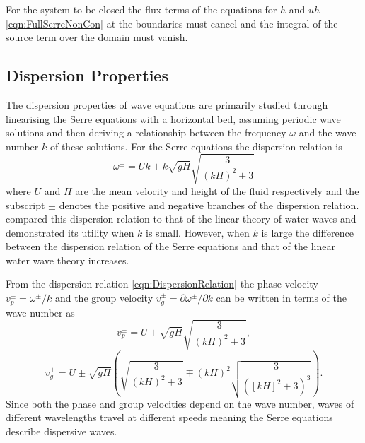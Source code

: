 For the system to be closed the flux terms of the equations for $h$ and $uh$ \eqref{eqn:FullSerreNonCon} at the boundaries must cancel and the integral of the source term over the domain must vanish.

\subsection{Dispersion Properties}
The dispersion properties of wave equations are primarily studied through linearising the Serre equations with a horizontal bed, assuming periodic wave solutions and then deriving a relationship between the frequency $\omega$ and the wave number $k$ of these solutions. For the Serre equations the dispersion relation \cite{Li-2014-169} is
\begin{equation}
\label{eqn:DispersionRelation}
\omega^\pm = Uk \pm k \sqrt{gH} \sqrt{\frac{3}{\left(kH\right)^2 + 3}}
\end{equation}
where $U$ and $H$ are the mean velocity and height of the fluid respectively and the subscript $\pm$ denotes the positive and negative branches of the dispersion relation. \citet{Barthelemy-2004-315} compared this dispersion relation to that of the linear theory of water waves and demonstrated its utility when $k$ is small. However, when $k$ is large the difference between the dispersion relation of the Serre equations and that of the linear water wave theory increases. 


From the dispersion relation \eqref{eqn:DispersionRelation} the phase velocity $v_p^\pm = \omega^\pm / k$  and the group velocity $v_g^\pm = \partial \omega^\pm / \partial  k$ can be written in terms of the wave number as
	\begin{equation*}
	\label{eqn:WaveVelocitiesPhase}
	v_p^\pm = U \pm \sqrt{gH}\sqrt{\frac{3}{\left(kH\right)^2 + 3}},
	\end{equation*}
	\begin{equation*}
	\label{eqn:WaveVelocitiesGroup}
	v_g^\pm = U \pm \sqrt{gH} \left(\sqrt{\frac{3}{\left(kH\right)^2 + 3}} \mp \left(kH\right)^2 \sqrt{\frac{3}{\left(\left[kH\right]^2 + 3 \right)^3}}\right).
	\end{equation*}
Since both the phase and group velocities depend on the wave number, waves of different wavelengths travel at different speeds meaning the Serre equations describe dispersive waves.


